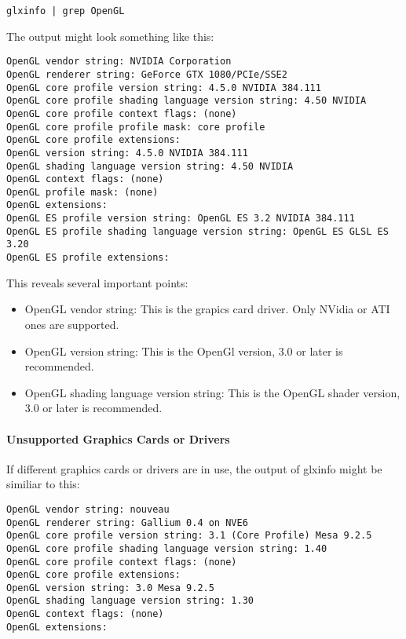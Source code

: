 \begin{lstlisting}
glxinfo | grep OpenGL
\end{lstlisting}

The output might look something like this:

\begin{lstlisting}
OpenGL vendor string: NVIDIA Corporation
OpenGL renderer string: GeForce GTX 1080/PCIe/SSE2
OpenGL core profile version string: 4.5.0 NVIDIA 384.111
OpenGL core profile shading language version string: 4.50 NVIDIA
OpenGL core profile context flags: (none)
OpenGL core profile profile mask: core profile
OpenGL core profile extensions:
OpenGL version string: 4.5.0 NVIDIA 384.111
OpenGL shading language version string: 4.50 NVIDIA
OpenGL context flags: (none)
OpenGL profile mask: (none)
OpenGL extensions:
OpenGL ES profile version string: OpenGL ES 3.2 NVIDIA 384.111
OpenGL ES profile shading language version string: OpenGL ES GLSL ES 3.20
OpenGL ES profile extensions:
\end{lstlisting}

This reveals several important points:

\begin{itemize}  
\item OpenGL vendor string: This is the grapics card driver. Only NVidia or ATI ones are supported.
\item OpenGL version string: This is the OpenGl version, 3.0 or later is recommended.
\item OpenGL shading language version string: This is the OpenGL shader version, 3.0 or later is recommended.
\end{itemize}

\paragraph{Unsupported Graphics Cards or Drivers}

If different graphics cards or drivers are in use, the output of glxinfo might be similiar to this:

\begin{lstlisting}
OpenGL vendor string: nouveau
OpenGL renderer string: Gallium 0.4 on NVE6
OpenGL core profile version string: 3.1 (Core Profile) Mesa 9.2.5
OpenGL core profile shading language version string: 1.40
OpenGL core profile context flags: (none)
OpenGL core profile extensions:
OpenGL version string: 3.0 Mesa 9.2.5
OpenGL shading language version string: 1.30
OpenGL context flags: (none)
OpenGL extensions:
\end{lstlisting}

